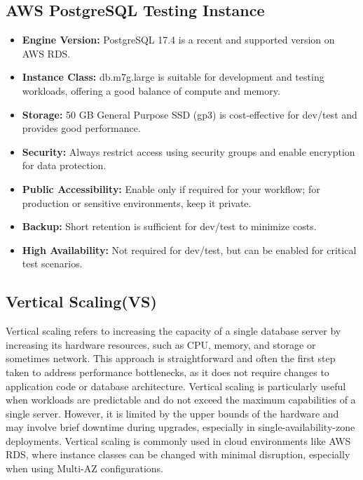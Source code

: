 \documentclass[conference]{IEEEtran}
\begin{document}
\subsection{AWS PostgreSQL Testing Instance\cite{b17}}\label{AA}
\begin{itemize}
\item \textbf{Engine Version:} PostgreSQL 17.4 is a recent and supported version on AWS RDS. \\
\item \textbf{Instance Class:} db.m7g.large is suitable for development and testing workloads, offering a good balance of compute and memory. \\
\item \textbf{Storage:} 50 GB General Purpose SSD (gp3) is cost-effective for dev/test and provides good performance. \\
\item \textbf{Security:} Always restrict access using security groups and enable encryption for data protection. \\
\item \textbf{Public Accessibility:} Enable only if required for your workflow; for production or sensitive environments, keep it private. \\
\item \textbf{Backup:} Short retention is sufficient for dev/test to minimize costs. \\
\item \textbf{High Availability:} Not required for dev/test, but can be enabled for critical test scenarios. \\
\end{itemize}

\subsection{Vertical Scaling(VS)\cite{b2}\cite{b8}}
Vertical scaling refers to increasing the capacity of a single database server by increasing its hardware resources, such as CPU, memory, and storage or sometimes network. This approach is straightforward and often the first step taken to address performance bottlenecks, as it does not require changes to application code or database architecture. Vertical scaling is particularly useful when workloads are predictable and do not exceed the maximum capabilities of a single server. However, it is limited by the upper bounds of the hardware and may involve brief downtime during upgrades, especially in single-availability-zone deployments. Vertical scaling is commonly used in cloud environments like AWS RDS, where instance classes can be changed with minimal disruption, especially when using Multi-AZ configurations.
\end{document}
